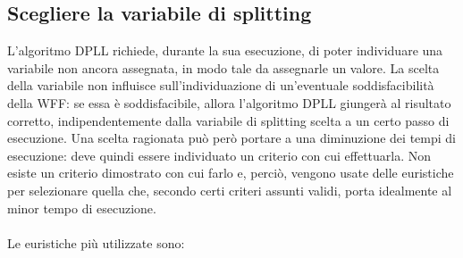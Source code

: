 \subsection{Scegliere la variabile di splitting}
L'algoritmo DPLL richiede, durante la sua esecuzione, di poter individuare una variabile non ancora assegnata, in modo tale da assegnarle un valore.
La scelta della variabile non influisce sull'individuazione di un'eventuale soddisfacibilità della WFF: se essa è soddisfacibile, allora l'algoritmo DPLL giungerà al risultato corretto, indipendentemente dalla variabile di splitting scelta a un certo passo di esecuzione.
Una scelta ragionata può però portare a una diminuzione dei tempi di esecuzione: deve quindi essere individuato un criterio con cui effettuarla. Non esiste un criterio dimostrato con cui farlo e, perciò, vengono usate delle euristiche per selezionare quella che, secondo certi criteri assunti validi, porta idealmente al minor tempo di esecuzione.\\
\\
Le euristiche più utilizzate sono:
